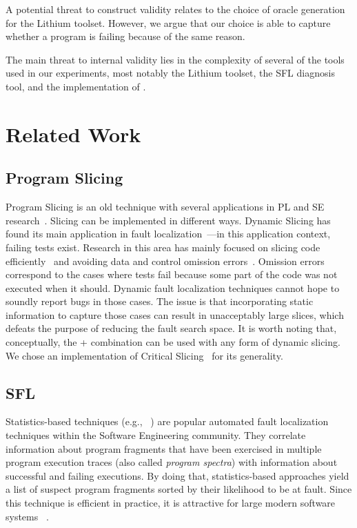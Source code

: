 \documentclass{article}
\begin{document}
A potential threat to construct validity relates to the choice of oracle generation
for the Lithium toolset. However, we argue that our choice is able to capture whether
a program is failing because of the same reason.

The main threat to internal validity lies in the complexity of several of the tools
used in our experiments, most notably the Lithium toolset, the SFL diagnosis tool,
and the implementation of \comb{}.
%
\section{Related Work}


\subsection{Program Slicing}

Program Slicing is an old technique with several applications in PL
and SE research~\cite{Weiser:1981:PS:800078.802557}. Slicing can be
implemented in different ways. Dynamic Slicing has found its main
application in fault
localization~\cite{Agrawal:1990:DPS:93542.93576}---in this application
context, failing tests exist. Research in this area has mainly focused
on slicing code
efficiently~\cite{Wang:2008:DSJ:1330017.1330021,Wang:2004:UCB:998675.999455}
and avoiding data and control omission
errors~\cite{Zhang:2007:TLE:1250734.1250782,Lin:2018:BDE:3238147.3238163}. Omission errors correspond to the
cases where tests fail because some part of the code was not executed
when it should. Dynamic fault localization techniques cannot hope to
soundly report bugs in those cases. The issue is that incorporating
static information to capture those cases can result in unacceptably
large slices, which defeats the purpose of reducing the fault search
space. It is worth noting that, conceptually, the \sfl{}+\ds{} combination
can be used with any form of dynamic slicing. We chose an
implementation of Critical
Slicing~\cite{DeMillo:1996:CSS:229000.226310} for its generality.



\subsection{SFL}

Statistics-based techniques (e.g., ~\cite{Pearson:2017:EIF:3097368.3097441}) are
popular automated fault localization techniques within the Software Engineering
community. They correlate information about program fragments that have been
exercised in multiple program execution traces (also called \textit{program
spectra}) with information about successful and failing executions. By doing
that, statistics-based approaches yield a list of suspect program fragments
sorted by their likelihood to be at fault. Since this technique is efficient in
practice, it is attractive for large modern software systems ~\cite{Zoeteweij:2007:DES:1251988.1253298}.
\end{document}
